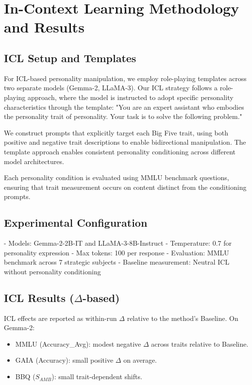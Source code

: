 \section{In-Context Learning Methodology and Results}
\label{app:icl}

\subsection{ICL Setup and Templates}

For ICL-based personality manipulation, we employ role-playing templates across two separate models (Gemma-2, LLaMA-3). Our ICL strategy follows a role-playing approach, where the model is instructed to adopt specific personality characteristics through the template: "You are an expert assistant who embodies the personality trait of {personality}. Your task is to solve the following problem."

We construct prompts that explicitly target each Big Five trait, using both positive and negative trait descriptions to enable bidirectional manipulation. The template approach enables consistent personality conditioning across different model architectures.

Each personality condition is evaluated using MMLU benchmark questions, ensuring that trait measurement occurs on content distinct from the conditioning prompts.

\subsection{Experimental Configuration}

- Models: Gemma-2-2B-IT and LLaMA-3-8B-Instruct
- Temperature: 0.7 for personality expression
- Max tokens: 100 per response
- Evaluation: MMLU benchmark across 7 strategic subjects
- Baseline measurement: Neutral ICL without personality conditioning

\subsection{ICL Results (\(\Delta\)-based)}

ICL effects are reported as within-run \(\Delta\) relative to the method's Baseline. On Gemma-2:
\begin{itemize}
\item MMLU (Accuracy\_Avg): modest negative \(\Delta\) across traits relative to Baseline.
\item GAIA (Accuracy): small positive \(\Delta\) on average.
\item BBQ (\(S_{AMB}\)): small trait-dependent shifts.
\end{itemize}

